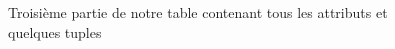 \documentclass[a4paper,sffamily,12pt]{article}
\begin{document}
				\begin{figure}[!h]
					\centering						
					\caption{Troisième partie de notre table contenant tous les attributs et quelques tuples}
					\label{table_p3}	
				\end{figure}	
	
\end{document}
